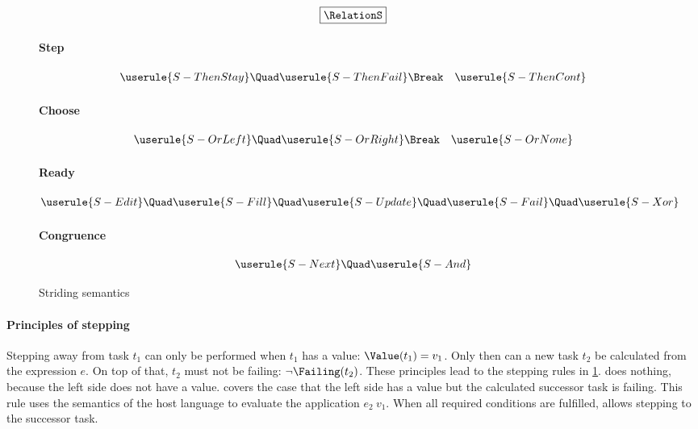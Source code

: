 \begin{figure}[h]
  \small

  \begin{gather*}
    \boxed{\RelationS}
  \end{gather*}

  \paragraph{Step}
  \begin{align*}
    \userule{S-ThenStay} \Quad
    & \userule{S-ThenFail} \Break
    & \userule{S-ThenCont}
  \end{align*}

  \paragraph{Choose}
  \begin{align*}
    \userule{S-OrLeft} \Quad
    & \userule{S-OrRight} \Break
    & \userule{S-OrNone}
  \end{align*}

  \paragraph{Ready}
  \begin{gather*}
    \userule{S-Edit} \Quad \userule{S-Fill} \Quad \userule{S-Update} \Quad
    \userule{S-Fail} \Quad \userule{S-Xor}
  \end{gather*}

  \paragraph{Congruence}
  \begin{gather*}
    \userule{S-Next} \Quad
    \userule{S-And}
  \end{gather*}

  \caption{Striding semantics} \label{fig:striding-semantics}
\end{figure}



\paragraph{Principles of stepping}
\label{sub:stepping-principles}

Stepping away from task $t_1$ can only be performed when
$t_1$ has a value: $\Value(t_1) = v_1$.
Only then can a new task $t_2$ be calculated from the expression $e$.
On top of that, $t_2$ must not be failing: $\neg\Failing(t_2)$.
%
These principles lead to the stepping rules in \cref{fig:striding-semantics}.
 does nothing,
because the left side does not have a value.
 covers the case that
the left side has a value but the calculated successor task is failing.
This rule uses the semantics of the host language to evaluate the application $e_2\ v_1$.
When all required conditions are fulfilled,  allows stepping to the successor task.



